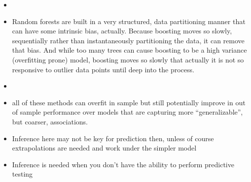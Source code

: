\documentclass[xcolor={dvipsnames}]{beamer}
\begin{document}
{\begin{itemize}
\item[]
\item Random forests are built in a very structured, data partitioning manner that can have some intrinsic bias, actually.  Because boosting moves so slowly, sequentially rather than instantaneously partitioning the data, it can remove that bias.  And while too many trees can cause boosting to be a high variance (overfitting prone) model, boosting moves so slowly that actually it is not so responsive to outlier data points until deep into the process.
\item[]
\item all of these methods can overfit in sample but still potentially improve in out of sample performance
over models that are capturing more ``generalizable'', but coarser, associations.  
\item Inference here may not be key for prediction then, unless of course extrapolations are needed and work under the simpler model
\item Inference is needed when you don't have the ability to perform predictive testing
\end{itemize}


}
\end{document}
